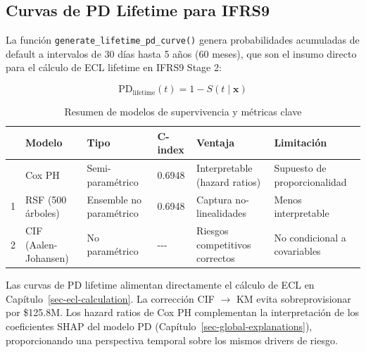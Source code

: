 \documentclass[
  spanish,
  11pt,
  letterpaper,
]{scrbook}
\theoremstyle{plain}
\theoremstyle{remark}
\begin{document}
\subsection{Curvas de PD Lifetime para
IFRS9}\label{curvas-de-pd-lifetime-para-ifrs9}

La función \texttt{generate\_lifetime\_pd\_curve()} genera
probabilidades acumuladas de default a intervalos de 30 días hasta 5
años (60 meses), que son el insumo directo para el cálculo de ECL
lifetime en IFRS9 Stage 2:

\[
\text{PD}_{\text{lifetime}}(t) = 1 - S(t \mid \mathbf{x})
\]

{

\begin{longtable}[]{@{}llllll@{}}

\caption{\label{tbl-survival-summary}Resumen de modelos de supervivencia
y métricas clave}

\tabularnewline

\toprule\noalign{}
& Modelo & Tipo & C-index & Ventaja & Limitación \\
\midrule\noalign{}
\endhead
\bottomrule\noalign{}
\endlastfoot
0 & Cox PH & Semi-paramétrico & 0.6948 & Interpretable (hazard ratios) &
Supuesto de proporcionalidad \\
1 & RSF (500 árboles) & Ensemble no paramétrico & 0.6948 & Captura
no-linealidades & Menos interpretable \\
2 & CIF (Aalen-Johansen) & No paramétrico & -\/-\/- & Riesgos
competitivos correctos & No condicional a covariables \\

\end{longtable}

}

\begin{tcolorbox}[enhanced jigsaw, arc=.35mm, bottomrule=.15mm, bottomtitle=1mm, breakable, colback=white, colbacktitle=quarto-callout-tip-color!10!white, colframe=quarto-callout-tip-color-frame, coltitle=black, left=2mm, leftrule=.75mm, opacityback=0, opacitybacktitle=0.6, rightrule=.15mm, title=\textcolor{quarto-callout-tip-color}{\faLightbulb}\hspace{0.5em}{Conexión con el pipeline}, titlerule=0mm, toprule=.15mm, toptitle=1mm]

Las curvas de PD lifetime alimentan directamente el cálculo de ECL en
Capítulo~\ref{sec-ecl-calculation}. La corrección CIF \(\rightarrow\) KM
evita sobreprovisionar por \$125.8M. Los hazard ratios de Cox PH
complementan la interpretación de los coeficientes SHAP del modelo PD
(Capítulo~\ref{sec-global-explanations}), proporcionando una perspectiva
temporal sobre los mismos drivers de riesgo.

\end{tcolorbox}
\end{document}
